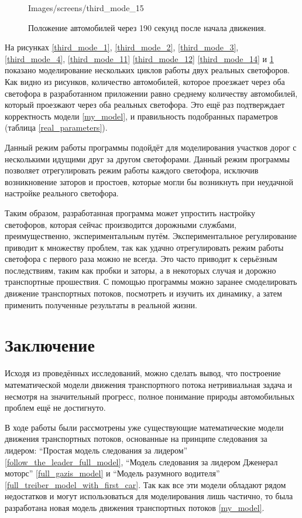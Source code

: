 \documentclass[12pt, a4paper]{extarticle}
\numberwithin{equation}{section}
\numberwithin{figure}{section}
\begin{document}
\begin{figure}[H]
\begin{center}
\begin{minipage}[h]{0.48\linewidth}
			{Images/screens/third_mode_15}
			\caption{Положение автомобилей через 190 секунд после начала движения.}
			\label{third_mode_15}
		\end{minipage}
	\end{center}
\end{figure}

На рисунках \ref{third_mode_1}, \ref{third_mode_2}, \ref{third_mode_3}, \ref{third_mode_4}, \ref{third_mode_11} \ref{third_mode_12} \ref{third_mode_14} и \ref{third_mode_15} показано моделирование нескольких циклов работы двух реальных светофоров. Как видно из рисунков, количество автомобилей, которое проезжает через оба светофора в разработанном приложении равно среднему количеству автомобилей, который проезжают через оба реальных светофора. Это ещё раз подтверждает корректность модели \eqref{my_model}, и правильность подобранных параметров (таблица \ref{real_parameters}).

Данный режим работы программы подойдёт для моделирования участков дорог с несколькими идущими друг за другом светофорами. Данный режим программы позволяет отрегулировать режим работы каждого светофора, исключив возникновение заторов и простоев, которые могли бы возникнуть при неудачной настройке реального светофора.  

Таким образом, разработанная программа может упростить настройку светофоров, которая сейчас производится дорожными службами, преимущественно, экспериментальным путём. Экспериментальное регулирование приводит к множеству проблем, так как удачно отрегулировать режим работы светофора с первого раза можно не всегда. Это часто приводит к серьёзным последствиям, таким как пробки и заторы, а в некоторых случая и дорожно транспортные прошествия. С помощью программы можно заранее смоделировать движение транспортных потоков, посмотреть и изучить их динамику, а затем применить полученные результаты в реальной жизни.

\newpage
\section*{Заключение}
Исходя из проведённых исследований, можно сделать вывод, что построение математической модели  движения транспортного потока нетривиальная задача и несмотря на значительный прогресс, полное понимание природы автомобильных проблем ещё не достигнуто. 

В ходе работы были рассмотрены уже существующие математические модели движения транспортных потоков, основанные на принципе следования за лидером: ``Простая модель следования за лидером''  \eqref{follow_the_leader_full_model}, ``Модель следования за лидером Дженерал моторс''  \eqref{full_gazis_model} и ``Модель разумного водителя'' \eqref{full_treiber_model_with_first_car}. Так как все эти модели обладают рядом недостатков и могут использоваться для моделирования лишь частично, то была разработана новая модель движения транспортных потоков \eqref{my_model}. 
\end{document}
